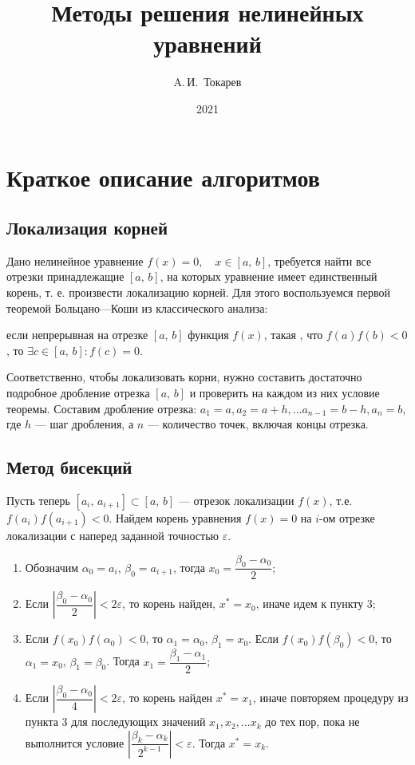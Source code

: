 \documentclass[12pt, a4paper]{article}
\title{Методы решения нелинейных уравнений}
\author{A.\,И.~Токарев}
\date{2021}
\begin{document}
\maketitle
\tableofcontents 
\newpage

\section{Краткое описание алгоритмов}
\subsection{Локализация корней}

Дано нелинейное уравнение $f(x) = 0, \quad x \in [a,\, b]$, требуется найти все отрезки принадлежащие $[a,\, b]$, на которых уравнение имеет единственный корень, т. е. произвести локализацию корней. Для этого воспользуемся первой теоремой Больцано---Коши из классического анализа:

если непрерывная на отрезке $[a,\, b]$ функция $f(x)$, такая , что $f(a)f(b) < 0$, то $\exists c \in [a,\, b] \colon f(c) = 0$.

Соответственно, чтобы локализовать корни, нужно составить достаточно подробное дробление отрезка  $[a,\, b]$ и проверить на каждом из них условие теоремы. Составим дробление отрезка: $a_1 = a, a_2 = a + h, ... a_{n-1} = b - h, a_n = b$, где $h$ --- шаг дробления, а $n$ --- количество точек, включая концы отрезка.

\subsection{Метод бисекций}
Пусть теперь $[a_i,\, a_{i+1}] \subset [a,\, b]$ --- отрезок локализации $f(x)$, т.е. $f(a_i)f(a_{i+1})<0$. Найдем корень уравнения $f(x)=0$ на $i$-ом отрезке локализации с наперед заданной точностью $\varepsilon$.

\begin{enumerate}
\item Обозначим $\alpha_0 = a_i$, $\beta_0 = a_{i+1}$, тогда $x_0 = \dfrac{\beta_0 - \alpha_0}{2}$;
\item Если $\left|\dfrac{\beta_0  - \alpha_0}{2} \right| < 2\varepsilon$, то корень найден,  $x^* = x_0$, иначе идем к пункту 3;
\item Если $f(x_0)f(\alpha_0) < 0$, то  $\alpha_1 = \alpha_0$, $\beta_1 = x_0$. Если $f(x_0)f(\beta_0) < 0$, то $\alpha_1 = x_0$, $\beta_1 = \beta_0$. Тогда $x_1 = \dfrac{\beta_1 - \alpha_1}{2}$;
\item Если $\left|\dfrac{\beta_0  - \alpha_0}{4} \right| < 2\varepsilon$, то корень найден $x^* = x_1$, иначе повторяем процедуру из пункта 3 для последующих значений $x_1, x_2, ... x_k$ до тех пор, пока не выполнится условие $\left|\dfrac{\beta_k  - \alpha_k}{2^{k-1}} \right| < \varepsilon$. Тогда $x^* = x_k$.
\end{enumerate}
\end{document}
